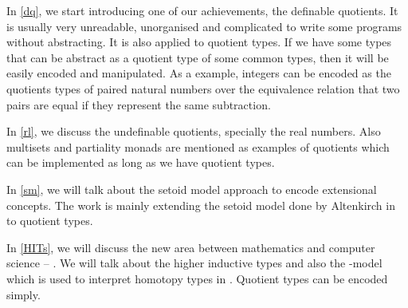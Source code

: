 In \autoref{dq}, we start introducing one of our achievements, the
definable quotients. It is usually very unreadable, unorganised and
complicated to write some programs without abstracting. It is also
applied to quotient types. If we have some types that can be abstract
as a quotient type of some common types, then it will be easily
encoded and manipulated. As a example, integers can be encoded as the
quotients types of paired natural numbers over the equivalence
relation that two pairs are equal if they represent the same
subtraction.

In \autoref{rl}, we discuss the undefinable quotients, specially the
real numbers. Also multisets and partiality monads are mentioned as
examples of quotients which can be implemented as long as we have
quotient types. 


In \autoref{sm}, we will talk about the setoid model approach to encode
extensional concepts. The work is mainly extending the setoid model
done by Altenkirch in \cite{alti:lics99} to
quotient types.


In \autoref{HITs}, we will discuss the new area between mathematics and
computer science -- \hott. We will talk about the higher inductive
types and also the \wog-model which is used to interpret
homotopy types in \itt. Quotient types can be encoded \hott simply.